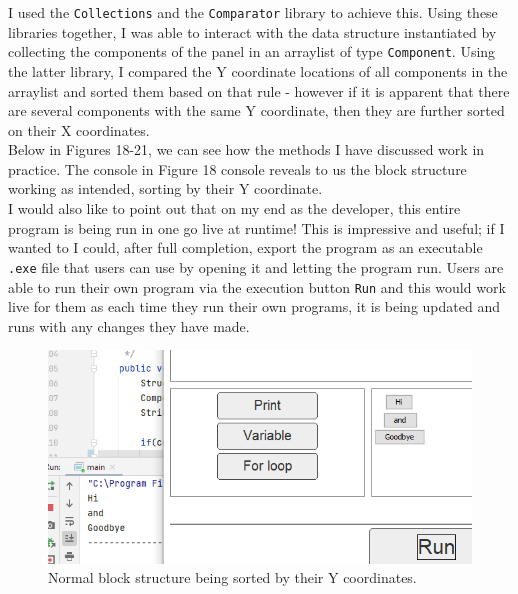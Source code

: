 \documentclass[a4paper, 12pt]{article}
\begin{document}
            I used the \texttt{Collections} and the \texttt{Comparator} library to achieve this. Using these libraries
            together, I was able to interact with the data structure instantiated by collecting the components
            of the panel in an arraylist of type \texttt{Component}. Using the latter library, I compared
            the Y coordinate locations of all components in the arraylist and sorted them based on that
            rule - however if it is apparent that there are several components with the same Y coordinate,
            then they are further sorted on their X coordinates. \\

            Below in Figures 18-21, we can see how the methods I have discussed work in practice. The console
            in Figure 18 console reveals to us the block structure working as intended, sorting by their Y
            coordinate. \\

            I would also like to point out that on my end as the developer, this entire program is being run
            in one go live at runtime! This is impressive and useful; if I wanted to I could, after full
            completion, export the program as an executable \texttt{.exe} file that users can use by opening
            it and letting the program run. Users are able to run their own program via the execution button
            \texttt{Run} and this would work live for them as each time they run their own programs, it is
            being updated and runs with any changes they have made.

            \clearpage
            \begin{figure}[h]
                \centering
                \includegraphics[width=120mm]{blockstructure1.png}
                \caption{Normal block structure being sorted by their Y coordinates.}
            \end{figure}
\end{document}
